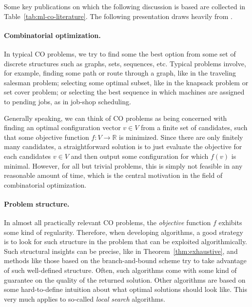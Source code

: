 \documentclass{report}
\theoremstyle{definition}
\theoremstyle{plain}
\begin{document}
Some key publications on which the following discussion is based are collected in
Table~\ref{tab:ml-co-literature}.
%
The following presentation draws heavily from \cite{bengioMachineLearningCombinatorial2020}.

\paragraph{Combinatorial optimization.}
In typical CO problems, we try to find some the best option from some set of
discrete structures such as graphs, sets, sequences, etc.
%
Typical problems involve, for example, finding some path or route through a
graph, like in the traveling salesman problem; selecting some optimal subset,
like in the knapsack problem or set cover problem; or selecting the best
sequence in which machines are assigned to pending jobs, as in job-shop
scheduling.

Generally speaking, we can think of CO problems as being concerned with finding
an optimal configuration vector $v \in V$ from a finite set of candidates, such
that some objective function $f : V \rightarrow \mathbb{R}$ is minimized.
%
Since there are only finitely many candidates, a straightforward solution is to
just evaluate the objective for each candidates $v \in V$ and then output some
configuration for which $f(v)$ is minimal.
%
However, for all but trivial problems, this is simply not feasible in any
reasonable amount of time, which is the central motivation in the field of
combinatorial optimization.

\paragraph{Problem structure.}
In almost all practically relevant CO problems, the \emph{objective} function
$f$ exhibits some kind of regularity.
%
Therefore, when developing algorithms, a good strategy is to look for such
structure in the problem that can be exploited algorithmically.
%
Such structural insights can be precise, like in Theorem~\ref{thm:exhaustive}, and methods like
those based on the branch-and-bound scheme try to take advantage of such
well-defined structure. Often, such algorithms come with some kind of guarantee
on the quality of the returned solution.
%
Other algorithms are based on some hard-to-define intuition about what optimal
solutions should look like.
%
This very much applies to so-called \emph{local search} algorithms.
\end{document}
